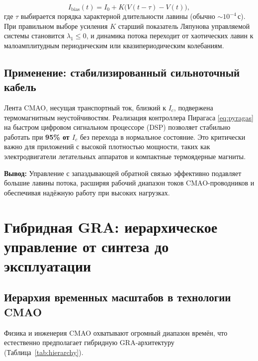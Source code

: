 \documentclass[12pt,a4paper]{article}
\numberwithin{equation}{section}
\begin{document}
\begin{equation}
I_{\text{bias}}(t) = I_0 + K \big( V(t - \tau) - V(t) \big),
\label{eq:pyragas}
\end{equation}
где $\tau$ выбирается порядка характерной длительности лавины (обычно $\sim 10^{-4}$\,с). При правильном выборе усиления $K$ старший показатель Ляпунова управляемой системы становится $\lambda_1 \le 0$, и динамика потока переходит от хаотических лавин к малоамплитудным периодическим или квазипериодическим колебаниям.

\subsection{Применение: стабилизированный сильноточный кабель}

Лента CMAO, несущая транспортный ток, близкий к $I_c$, подвержена термомагнитным неустойчивостям. Реализация контроллера Пирагаса \eqref{eq:pyragas} на быстром цифровом сигнальном процессоре (DSP) позволяет стабильно работать при \textbf{95\% от $I_c$} без перехода в нормальное состояние. Это критически важно для приложений с высокой плотностью мощности, таких как электродвигатели летательных аппаратов и компактные термоядерные магниты.

\textbf{Вывод:} Управление с запаздывающей обратной связью эффективно подавляет большие лавины потока, расширяя рабочий диапазон токов CMAO-проводников и обеспечивая надёжную работу при высоких нагрузках.

\section{Гибридная GRA: иерархическое управление от синтеза до эксплуатации}
\label{sec:hybrid}

\subsection{Иерархия временных масштабов в технологии CMAO}

Физика и инженерия CMAO охватывают огромный диапазон времён, что естественно предполагает гибридную GRA-архитектуру (Таблица~\ref{tab:hierarchy}).
\end{document}
